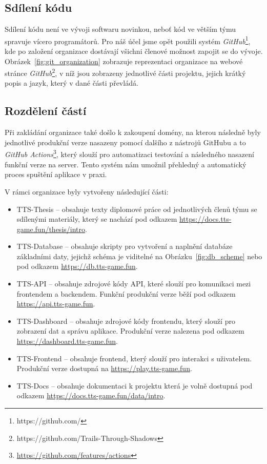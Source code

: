 \subsection{Sdílení kódu}
\label{subsec:implementation-collaboration-sharing}
Sdílení kódu není ve vývoji softwaru novinkou, neboť kód ve větším týmu spravuje vícero programátorů. Pro náš účel jsme opět použili systém \textit{GitHub}\footnote{https://github.com/}, kde po založení organizace dostávají všichni členové možnost zapojit se do vývoje. Obrázek~\ref{fig:git_organization} zobrazuje reprezentaci organizace na webové stránce \textit{GitHub}\footnote{https://github.com/Trails-Through-Shadows}, v níž jsou zobrazeny jednotlivé části projektu, jejich krátký popis a jazyk, který v dané části převládá.

\subsection*{Rozdělení částí}
\label{subsec:implementation-collaboration-sharing-parts}
Při zakládání organizace také došlo k zakoupení domény, na kterou následně byly jednotlivé produkční verze nasazeny pomocí dalšího z nástrojů GitHubu a to \textit{GitHub Actions}\footnote{\href{https://github.com/features/actions}{https://github.com/features/actions}}, který slouží pro automatizaci testování a následného nasazení funkční verze na server. Tento systém nám umožnil přehledný a automatický proces spuštění aplikace v praxi.

\noindent
V rámci organizace byly vytvořeny následující části:

\begin{itemize}
    \item TTS-Thesis    -- obsahuje texty diplomové práce od jednotlivých členů týmu se sdílenými materiály, který se nachází pod odkazem \url{https://docs.tts-game.fun/thesis/intro}.
    \item TTS-Database  -- obsahuje skripty pro vytvoření a naplnění databáze základními daty, jejichž schéma je viditelné na Obrázku~\ref{fig:db_scheme} nebo pod odkazem \url{https://db.tts-game.fun}.
    \item TTS-API       -- obsahuje zdrojové kódy API, které slouží pro komunikaci mezi frontendem a backendem. Funkční produkční verze běží pod odkazem \url{https://api.tts-game.fun}.
    \item TTS-Dashboard -- obsahuje zdrojové kódy frontendu, který slouží pro zobrazení dat a správu aplikace. Produkční verze nalezena pod odkazem \url{https://dashboard.tts-game.fun}.
    \item TTS-Frontend  -- obsahuje frontend, který slouží pro interakci s uživatelem. Produkční verze dostupná na \url{https://play.tts-game.fun}.
    \item TTS-Docs      -- obsahuje dokumentaci k projektu která je volně dostupná pod odkazem \url{https://docs.tts-game.fun/data/intro}.
\end{itemize}

